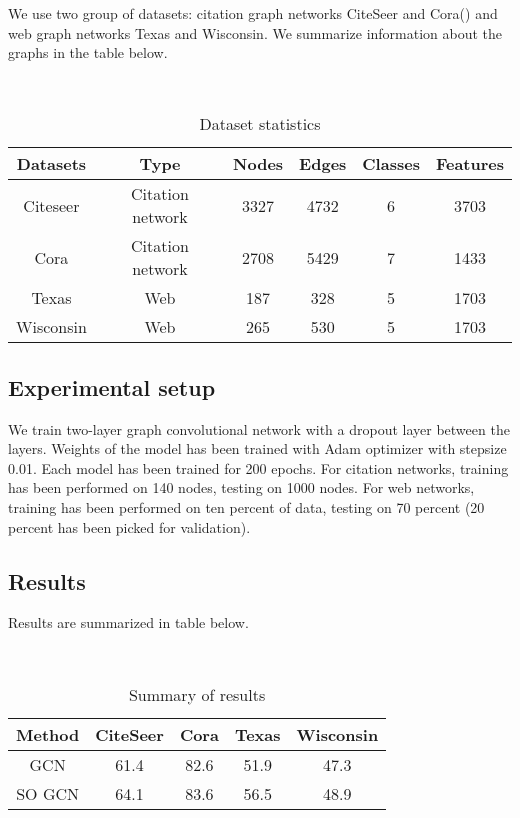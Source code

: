 \documentclass{article}
\begin{document}
We use two group of datasets: citation graph networks CiteSeer and Cora(\cite{Sen}) and web graph networks Texas and Wisconsin. We summarize information about the graphs in the table below.
\begin{table}[h]
\centering
\caption{Dataset statistics}
~\\
\begin{tabular}{c c c c c c}
{\bf Datasets} & {\bf Type} & {\bf Nodes} & {\bf Edges} & {\bf Classes} & {\bf Features}\\
\hline
Citeseer & Citation network & 3327 & 4732 & 6 & 3703\\
Cora & Citation network & 2708 & 5429 & 7 & 1433 \\
Texas & Web & 187 & 328 & 5 & 1703\\
Wisconsin & Web & 265 & 530 & 5 & 1703 \\
\end{tabular}
\end{table}

\subsection{Experimental setup}

We train two-layer graph convolutional network with a dropout layer between the layers. Weights of the model has been trained with Adam optimizer with stepsize 0.01. Each model has been trained for 200 epochs. For citation networks, training has been performed on 140 nodes, testing on 1000 nodes. For web networks, training has been performed on ten percent of data, testing on 70 percent (20 percent has been picked for validation).

\subsection{Results}

Results are summarized in table below.

\begin{table}[h]
\centering
\caption{Summary of results} 
~\\
\begin{tabular}{c c c c c}
{\bf Method} & {\bf CiteSeer} & {\bf Cora} & {\bf Texas} & {\bf Wisconsin}\\
\hline
GCN & 61.4 & 82.6 & 51.9 & 47.3\\
SO GCN & 64.1 & 83.6 & 56.5 & 48.9\\
\end{tabular}
\end{table}
\end{document}
